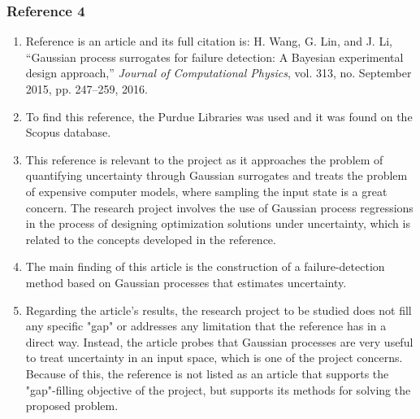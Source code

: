 \documentclass{journal}
\begin{document}
\subsubsection{Reference 4}
\begin{enumerate}
	\item Reference \cite{Wang2016} is an article and its full citation is: H. Wang, G. Lin, and J. Li, “Gaussian process surrogates for failure detection: A Bayesian experimental design approach,” \textit{Journal of Computational Physics}, vol. 313, no. September 2015, pp. 247–259, 2016.
	\item To find this reference, the Purdue Libraries was used and it was found on the Scopus database.
	\item This reference is relevant to the project as it approaches the problem of quantifying uncertainty through Gaussian surrogates and treats the problem of expensive computer models, where sampling the input state is a great concern. The research project involves the use of Gaussian process regressions in the process of designing optimization solutions under uncertainty, which is related to the concepts developed in the reference.  
	\item The main finding of this article is the construction of a failure-detection method based on Gaussian processes that estimates uncertainty.
	\item Regarding the article's results, the research project to be studied does not fill any specific "gap" or addresses any limitation that the reference has in a direct way. Instead, the article probes that Gaussian processes are very useful to treat uncertainty in an input space, which is one of the project concerns. Because of this, the reference is not listed as an article that supports the "gap"-filling objective of the project, but supports its methods for solving the proposed problem.
\end{enumerate}
\end{document}

